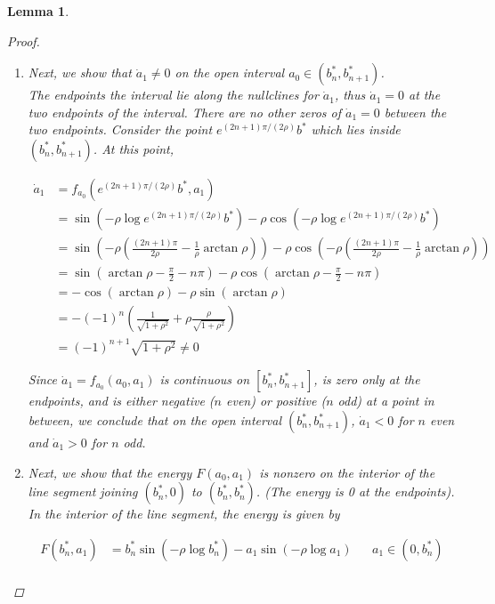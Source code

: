 \documentclass[12pt]{article}
\newtheorem{lemma}{Lemma}
\begin{document}
\begin{lemma}
\begin{proof}
\begin{enumerate}
Since $\arctan \rho \in (-\pi/2, \pi/2)$, $e^{n \pi/\rho} < b^*_{n+1}$.

\item Next, we show that $\dot a_1 \neq 0$ on the open interval 
$a_0 \in (b^*_n, b^*_{n+1})$.\\

The endpoints the interval lie along the nullclines for $\dot a_1$, thus $\dot a_1 = 0$ at the two endpoints of the interval. There are no other zeros of $\dot a_1 = 0$ between the two endpoints. Consider the point $e^{(2n+1)\pi/(2\rho) }b^*$ which lies inside $(b^*_n, b^*_{n+1})$. At this point,

\begin{align*}
\dot a_1 &= f_{a_0}(e^{(2n+1) \pi / (2\rho)}b^*, a_1) \\
&= \sin(-\rho \log e^{(2n+1) \pi / (2\rho)} b^* ) - \rho \cos( -\rho \log e^{(2n+1) \pi / (2\rho)} b^* ) \\
&= \sin\left(-\rho \left( \frac{(2n + 1)\pi}{2\rho} - \frac{1}{\rho} \arctan \rho \right) \right) - \rho \cos\left(-\rho \left( \frac{(2n + 1)\pi}{2\rho} - \frac{1}{\rho} \arctan \rho \right) \right) \\
&= \sin\left(\arctan \rho - \frac{\pi}{2} - n \pi \right) - \rho \cos\left(\arctan \rho - \frac{\pi}{2} - n \pi \right) \\
&= -\cos\left(\arctan \rho \right) - \rho \sin\left(\arctan \rho\right) \\
&= -(-1)^n \left( \frac{1}{\sqrt{1+\rho^2}} + \rho \frac{\rho}{\sqrt{1+\rho^2}}  \right) \\
&= (-1)^{n+1}\sqrt{1 + \rho^2} \neq 0
\end{align*}

Since $\dot a_1 = f_{a_0}(a_0, a_1)$ is continuous on $[b^*_n, b^*_{n+1}]$, is zero only at the endpoints, and is either negative ($n$ even) or positive ($n$ odd) at a point in between, we conclude that on the open interval $(b^*_n, b^*_{n+1})$, $\dot a_1 < 0$ for $n$ even and $\dot a_1 > 0$ for $n$ odd.

\item Next, we show that the energy $F(a_0, a_1)$ is nonzero on the interior of the line segment joining $(b^*_n, 0)$ to $(b^*_n, b^*_n)$. (The energy is 0 at the endpoints).\\

In the interior of the line segment, the energy is given by

\begin{align*}
F(b^*_n, a_1) &= b^*_n \sin(-\rho \log b^*_n) - a_1 \sin(-\rho \log a_1) && a_1 \in (0, b^*_n)\\
\end{align*}


\end{enumerate}
\end{proof}
\end{lemma}
\end{document}
